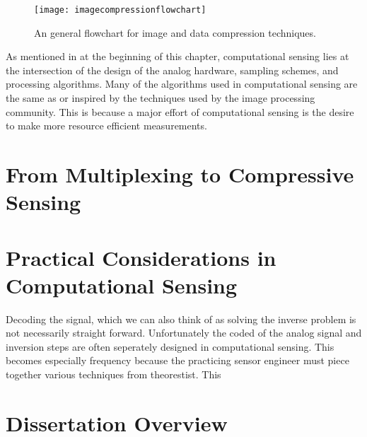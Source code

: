 \begin{figure}
    \centering
    \texttt{[image: imagecompressionflowchart]}
    \caption{An general flowchart for image and data compression techniques.}
    \label{fig:imagecompressionflowchart}
\end{figure}

As mentioned in at the beginning of this chapter, computational sensing lies at the intersection of the design of the analog hardware, sampling schemes, and processing algorithms. Many of the algorithms used in computational sensing are the same as or inspired by the techniques used by the image processing community. This is because a major effort of computational sensing is the desire to make more resource efficient measurements. 

\section{From Multiplexing to Compressive Sensing}\label{sec:multiplexingtocompressivesensing}



\section{Practical Considerations in Computational Sensing}

Decoding the signal, which we can also think of as solving the inverse problem is not necessarily straight forward. Unfortunately the coded of the analog signal and inversion steps are often seperately designed in computational sensing. This becomes especially frequency because the practicing sensor engineer must piece together various techniques from theorestist. This 

\section{Dissertation Overview}



%  
%

